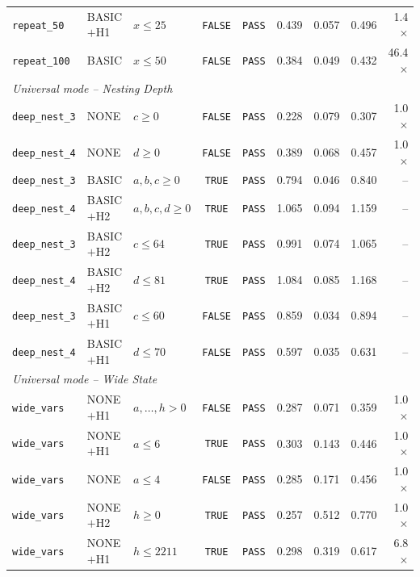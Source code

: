 {\begin{longtable}{p{} p{} p{} c c r r r r}
\texttt{repeat\_50} & BASIC$+$H1 & $x \leq 25$ & \texttt{FALSE} & \texttt{PASS} & 0.439 & 0.057 & 0.496 & 1.4$\times$ \\
\texttt{repeat\_100} & BASIC & $x \leq 50$ & \texttt{FALSE} & \texttt{PASS} & 0.384 & 0.049 & 0.432 & 46.4$\times$ \\
\midrule
\multicolumn{9}{l}{\textit{Universal mode -- Nesting Depth}} \\
\midrule
\texttt{deep\_nest\_3} & NONE & $c \geq 0$ & \texttt{FALSE} & \texttt{PASS} & 0.228 & 0.079 & 0.307 & 1.0$\times$ \\
\texttt{deep\_nest\_4} & NONE & $d \geq 0$ & \texttt{FALSE} & \texttt{PASS} & 0.389 & 0.068 & 0.457 & 1.0$\times$ \\
\texttt{deep\_nest\_3} & BASIC & $a,b,c \geq 0$ & \texttt{TRUE} & \texttt{PASS} & 0.794 & 0.046 & 0.840 & -- \\
\texttt{deep\_nest\_4} & BASIC$+$H2 & $a,b,c,d \geq 0$ & \texttt{TRUE} & \texttt{PASS} & 1.065 & 0.094 & 1.159 & -- \\
\texttt{deep\_nest\_3} & BASIC$+$H2 & $c \leq 64$ & \texttt{TRUE} & \texttt{PASS} & 0.991 & 0.074 & 1.065 & -- \\
\texttt{deep\_nest\_4} & BASIC$+$H2 & $d \leq 81$ & \texttt{TRUE} & \texttt{PASS} & 1.084 & 0.085 & 1.168 & -- \\
\texttt{deep\_nest\_3} & BASIC$+$H1 & $c \leq 60$ & \texttt{FALSE} & \texttt{PASS} & 0.859 & 0.034 & 0.894 & -- \\
\texttt{deep\_nest\_4} & BASIC$+$H1 & $d \leq 70$ & \texttt{FALSE} & \texttt{PASS} & 0.597 & 0.035 & 0.631 & -- \\
\midrule
\multicolumn{9}{l}{\textit{Universal mode -- Wide State}} \\
\midrule
\texttt{wide\_vars} & NONE$+$H1 & $a,{\ldots},h > 0$ & \texttt{FALSE} & \texttt{PASS} & 0.287 & 0.071 & 0.359 & 1.0$\times$ \\
\texttt{wide\_vars} & NONE$+$H1 & $a \leq 6$ & \texttt{TRUE} & \texttt{PASS} & 0.303 & 0.143 & 0.446 & 1.0$\times$ \\
\texttt{wide\_vars} & NONE & $a \leq 4$ & \texttt{FALSE} & \texttt{PASS} & 0.285 & 0.171 & 0.456 & 1.0$\times$ \\
\texttt{wide\_vars} & NONE$+$H2 & $h \geq 0$ & \texttt{TRUE} & \texttt{PASS} & 0.257 & 0.512 & 0.770 & 1.0$\times$ \\
\texttt{wide\_vars} & NONE$+$H1 & $h \leq 2211$ & \texttt{TRUE} & \texttt{PASS} & 0.298 & 0.319 & 0.617 & 6.8$\times$ \\

\end{longtable}}
